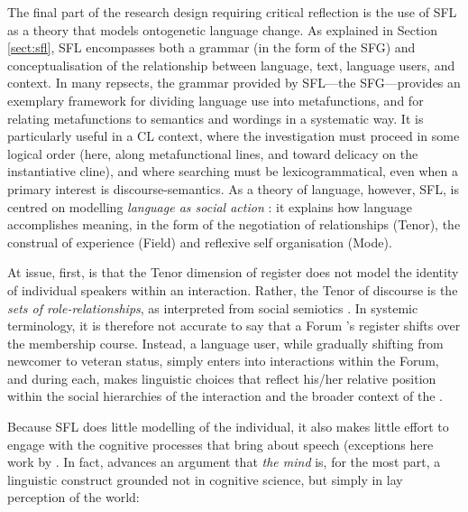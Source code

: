 The final part of the research design requiring critical reflection is the use of \gls{SFL} as a theory that models ontogenetic language change. As explained in Section \ref{sect:sfl}, \gls{SFL} encompasses both a grammar (in the form of the \gls{SFG}) and conceptualisation of the relationship between language, text, language users, and context. In many repsects, the grammar provided by \gls{SFL}---the \gls{SFG}---provides an exemplary framework for dividing language use into metafunctions, and for relating metafunctions to semantics and wordings in a systematic way. It is particularly useful in a \gls{CL} context, where the investigation must proceed in some logical order (here, along metafunctional lines, and toward delicacy on the instantiative cline), and where searching must be lexicogrammatical, even when a primary interest is \glspl{discourse-semantic}. As a theory of language, however, \gls{SFL}, is centred on modelling \emph{language as social action} \cite{halliday1978language}: it explains how language accomplishes meaning, in the form of the negotiation of relationships (Tenor), the construal of experience (Field) and reflexive self organisation (Mode).

At issue, first, is that the Tenor dimension of register does not model the identity of individual speakers within an interaction. Rather, the Tenor of discourse is the \emph{sets of role\hyp{}relationships}, as interpreted from social semiotics \cite{halliday_language_1989}. In systemic terminology, it is therefore not accurate to say that a \gls{Forum} 's register shifts over the membership course. Instead, a language user, while gradually shifting from newcomer to veteran status, simply enters into interactions within the \gls{Forum}, and during each, makes linguistic choices that reflect his\slash her relative position within the social hierarchies of the interaction and the broader context of the .

Because \gls{SFL} does little modelling of the individual, it also makes little effort to engage with the cognitive processes that bring about speech (exceptions here work by \textcite{crocker2016information,degaetano-ortlieb_data_2014}. In fact, \textcite{matthiessen1998construing} advances an argument that \emph{the mind} is, for the most part, a linguistic construct grounded not in cognitive science, but simply in lay perception of the world:

